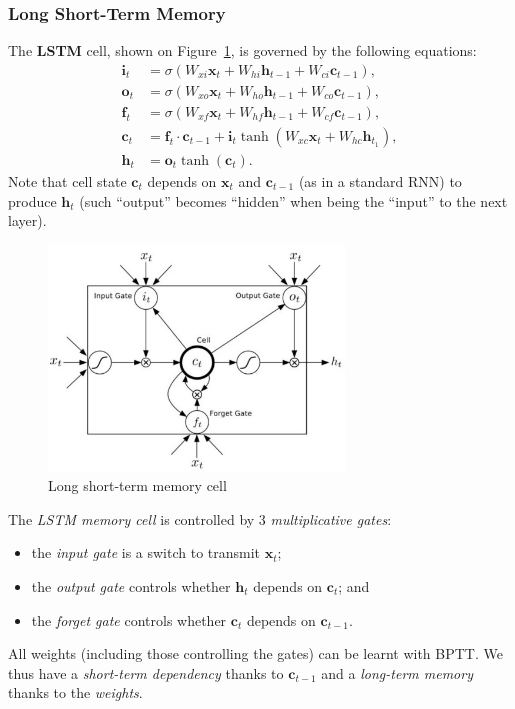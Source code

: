 \subsubsection{Long Short-Term Memory}
The \textbf{LSTM} cell, shown on Figure~\ref{fig:lstm}, is governed by the following equations:
\begin{align*}
	\bm{i}_t &= \sigma(W_{xi} \bm{x}_t + W_{hi} \bm{h}_{t-1} + W_{ci} \bm{c}_{t-1}),\\
	\bm{o}_t &= \sigma(W_{xo} \bm{x}_t + W_{ho} \bm{h}_{t-1} + W_{co} \bm{c}_{t-1}),\\
	\bm{f}_t &= \sigma(W_{xf} \bm{x}_t + W_{hf} \bm{h}_{t-1} + W_{cf} \bm{c}_{t-1}),\\
	\bm{c}_t &= \bm{f}_t \cdot \bm{c}_{t-1} + \bm{i}_t \tanh(W_{xc} \bm{x}_t + W_{hc} \bm{h}_{t_1}),\\
	\bm{h}_t &= \bm{o}_t \tanh(\bm{c}_t).
\end{align*}
Note that cell state \(\bm{c}_t\) depends on \(\bm{x}_t\) and \(\bm{c}_{t-1}\) (as in a standard RNN) to produce \(\bm{h}_t\) (such ``output'' becomes ``hidden'' when being the ``input'' to the next layer).
\begin{figure}[!hbtp]
	\centering
	\includegraphics[width=0.7\textwidth]{img/lstm}
	\caption{Long short-term memory cell}
	\label{fig:lstm}
\end{figure}
The \emph{LSTM memory cell} is controlled by 3 \emph{multiplicative gates}:
\begin{itemize}
	\item the \emph{input gate} is a switch to transmit \(\bm{x}_t\);
	\item the \emph{output gate} controls whether \(\bm{h}_t\) depends on \(\bm{c}_t\); and
	\item the \emph{forget gate} controls whether \(\bm{c}_t\) depends on \(\bm{c}_{t-1}\).
\end{itemize}
All weights (including those controlling the gates) can be learnt with BPTT.
We thus have a \emph{short-term dependency} thanks to \(\bm{c}_{t-1}\) and a \emph{long-term memory} thanks to the \emph{weights}.

